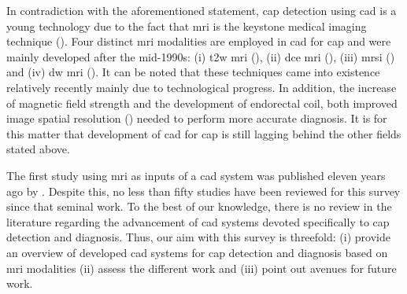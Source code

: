
In contradiction with the aforementioned statement, \ac{cap} detection using \acs{cad} is a young technology due to the fact that \ac{mri} is the keystone medical imaging technique (\cite{Hegde2013}). Four distinct \ac{mri} modalities are employed in \acs{cad} for \ac{cap} and were mainly developed after the mid-1990s: (i) \ac{t2w} \ac{mri} (\cite{Hricak1983}), (ii) \ac{dce} \ac{mri} (\cite{HuchBoni1995}), (iii) \ac{mrsi} (\cite{Kurhanewicz1996}) and (iv) \ac{dw} \ac{mri} (\cite{Scheidler1999}). It can be noted that these techniques came into existence relatively recently mainly due to technological progress. In addition, the increase of magnetic field strength and the development of endorectal coil, both improved image spatial resolution (\cite{Swanson2001}) needed to perform more accurate diagnosis. It is for this matter that development of \acs{cad} for \ac{cap} is still lagging behind the other fields stated above.

The first study using \ac{mri} as inputs of a \acs{cad} system was published eleven years ago by \cite{Chan2003}. Despite this, no less than fifty studies have been reviewed for this survey since that seminal work. To the best of our knowledge, there is no review in the literature regarding the advancement of \acs{cad} systems devoted specifically to \ac{cap} detection and diagnosis. Thus, our aim with this survey is threefold: (i) provide an overview of developed \acs{cad} systems for \ac{cap} detection and diagnosis based on \ac{mri} modalities (ii) assess the different work and (iii) point out avenues for future work.

